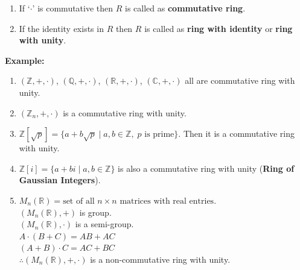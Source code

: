 \documentclass[11pt]{article}
\begin{document}
\newpage
\begin{enumerate}[resume]
    \item If `$\cdot$' is commutative then $R$ is called as \textbf{commutative ring}.
    \item If the identity exists in $R$ then $R$ is called as \textbf{ring with identity} or \textbf{ring with unity}.
\end{enumerate}

\bigskip
\noindent \textbf{Example:}
\begin{enumerate}
    \item $(\mathbb{Z}, +, \cdot)$, $(\mathbb{Q}, +, \cdot)$, $(\mathbb{R}, +, \cdot)$, $(\mathbb{C}, +, \cdot)$ all are commutative ring with unity.
    \item $(\mathbb{Z}_n, +, \cdot)$ is a commutative ring with unity.
    \item $\mathbb{Z}[\sqrt{p}] = \{a + b\sqrt{p} \mid a, b \in \mathbb{Z}, \; p \text{ is prime}\}$. Then it is a commutative ring with unity.
    \item $\mathbb{Z}[i] = \{a + bi \mid a, b \in \mathbb{Z}\}$ is also a commutative ring with unity (\textbf{Ring of Gaussian Integers}).
    \item $M_n(\mathbb{R}) = \text{set of all } n \times n \text{ matrices with real entries}$. \\
    $(M_n(\mathbb{R}), +)$ is group. \\
    $(M_n(\mathbb{R}), \cdot)$ is a semi-group. \\
    $A \cdot (B + C) = AB + AC$ \\
    $(A + B) \cdot C = AC + BC$ \\
    $\therefore (M_n(\mathbb{R}), +, \cdot)$ is a non-commutative ring with unity.
\end{enumerate}
\end{document}
